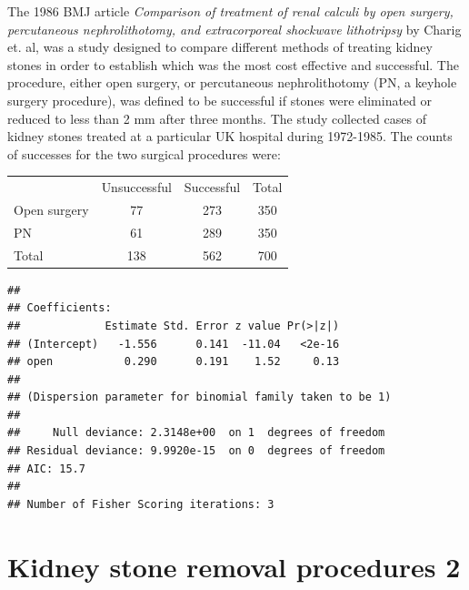 \documentclass[10pt,handout]{beamer}\usepackage[]{graphicx}\usepackage[]{color}
\makeatletter
\newenvironment{kframe}{%
 \def\at@end@of@kframe{}%
 \ifinner\ifhmode%
  \def\at@end@of@kframe{\end{minipage}}%
  \begin{minipage}{\columnwidth}%
 \fi\fi%
 \def\FrameCommand##1{\hskip\@totalleftmargin \hskip-\fboxsep
 \colorbox{shadecolor}{##1}\hskip-\fboxsep
     \hskip-\linewidth \hskip-\@totalleftmargin \hskip\columnwidth}%
 \MakeFramed {\advance\hsize-\width
   \@totalleftmargin\z@ \linewidth\hsize
   \@setminipage}}%
 {\par\unskip\endMakeFramed%
 \at@end@of@kframe}
\newenvironment{knitrout}{}{} %
\makeatother
\begin{document}
\begin{frame}
\vspace{-.91in}
	\tiny
The 1986 BMJ article \textit{Comparison of treatment of renal calculi by open surgery, percutaneous nephrolithotomy, and extracorporeal shockwave lithotripsy} by Charig et. al, was a study designed to compare different methods of treating kidney stones in order to establish which was the most cost effective and successful. The procedure, either open surgery, or percutaneous nephrolithotomy (PN, a keyhole surgery procedure), was defined to be successful if stones were eliminated or reduced to less than 2 mm after three months. The study collected cases of kidney stones treated at a particular UK hospital during 1972-1985. The counts of successes for the two surgical procedures were:
\vspace{-.11in}
\begin{table}[h]
	\centering
	\begin{tabular}{lcc|c}
		& Unsuccessful &  Successful & Total\\
		Open surgery & 77 & 273 & 350 \\
		PN & 61 & 289 & 350 \\
		\hline
		Total & 138 & 562 & 700
	\end{tabular}
\end{table}
\vspace{-.21in}
\begin{knitrout}\tiny
{}\color{fgcolor}\begin{kframe}
\begin{verbatim}
## 
## Coefficients:
##             Estimate Std. Error z value Pr(>|z|)
## (Intercept)   -1.556      0.141  -11.04   <2e-16
## open           0.290      0.191    1.52     0.13
## 
## (Dispersion parameter for binomial family taken to be 1)
## 
##     Null deviance: 2.3148e+00  on 1  degrees of freedom
## Residual deviance: 9.9920e-15  on 0  degrees of freedom
## AIC: 15.7
## 
## Number of Fisher Scoring iterations: 3
\end{verbatim}
\end{kframe}
\end{knitrout}

\end{frame}


\section{Kidney stone removal procedures 2}
\end{document}
